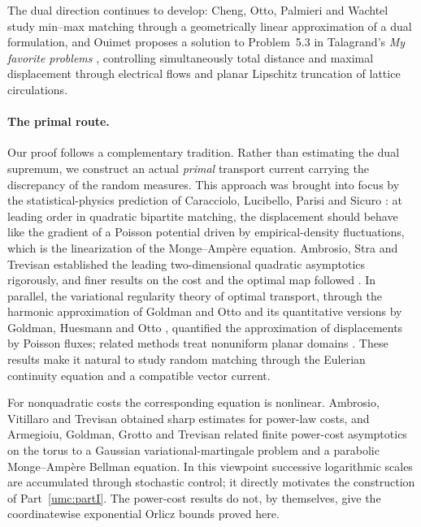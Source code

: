 \documentclass[11pt]{article}
\theoremstyle{definition}
\theoremstyle{remark}
\numberwithin{equation}{section}
\begin{document}
The dual direction continues to develop: Cheng, Otto, Palmieri and
Wachtel \cite{umc:COPW26} study min--max matching through a
geometrically linear approximation of a dual formulation, and Ouimet
\cite{umc:Ouimet26} proposes a solution to Problem~5.3 in Talagrand's
\emph{My favorite problems} \cite{TalagrandProblems}, controlling
simultaneously total distance and maximal displacement through
electrical flows and planar Lipschitz truncation of lattice
circulations.

\paragraph{The primal route.}
Our proof follows a complementary tradition. Rather than estimating the
dual supremum, we construct an actual \emph{primal} transport current
carrying the discrepancy of the random measures. This approach was
brought into focus by the statistical-physics prediction of
Caracciolo, Lucibello, Parisi and Sicuro \cite{umc:CLPS14}: at leading
order in quadratic bipartite matching, the displacement should behave
like the gradient of a Poisson potential driven by empirical-density
fluctuations, which is the linearization of the Monge--Amp\`ere
equation. Ambrosio, Stra and Trevisan \cite{umc:AST19} established the
leading two-dimensional quadratic asymptotics rigorously, and finer
results on the cost and the optimal map followed
\cite{umc:AG19,umc:AGTmap19}. In parallel, the variational regularity
theory of optimal transport, through the harmonic approximation of
Goldman and Otto \cite{umc:GO20} and its quantitative versions by
Goldman, Huesmann and Otto \cite{umc:GHO21,umc:GHO23}, quantified the
approximation of displacements by Poisson fluxes; related methods
treat nonuniform planar domains \cite{umc:AGT22}. These results make
it natural to study random matching through the Eulerian continuity
equation and a compatible vector current.

For nonquadratic costs the corresponding equation is nonlinear.
Ambrosio, Vitillaro and Trevisan \cite{umc:AVT24} obtained sharp
estimates for power-law costs, and Armegioiu, Goldman, Grotto and
Trevisan \cite{umc:AGGT26} related finite power-cost asymptotics on the
torus to a Gaussian variational-martingale problem and a parabolic
Monge--Amp\`ere Bellman equation. In this viewpoint successive
logarithmic scales are accumulated through stochastic control; it
directly motivates the construction of Part~\ref{umc:partI}. The
power-cost results do not, by themselves, give the coordinatewise
exponential Orlicz bounds proved here.
\end{document}
